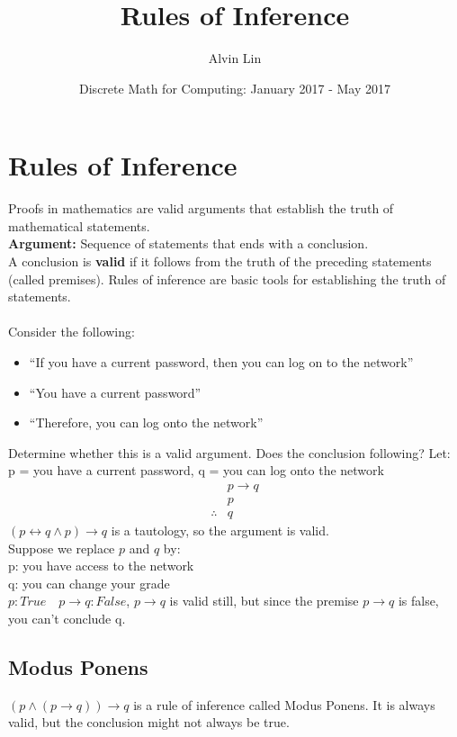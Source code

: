 \documentclass[letterpaper, 12pt]{math}
\title{Rules of Inference}
\author{Alvin Lin}
\date{Discrete Math for Computing: January 2017 - May 2017}
\begin{document}
\maketitle

\section*{Rules of Inference}
Proofs in mathematics are valid arguments that establish the truth of
mathematical statements. \\
\textbf{Argument:} Sequence of statements that ends with a conclusion. \\
A conclusion is \textbf{valid} if it follows from the truth of the preceding
statements (called premises). Rules of inference are basic tools for
establishing the truth of statements. \\ \\

Consider the following:
\begin{itemize}
  \item ``If you have a current password, then you can log on to the network''
  \item ``You have a current password''
  \item ``Therefore, you can log onto the network''
\end{itemize}
Determine whether this is a valid argument. Does the conclusion following?
Let: \\
p = you have a current password, q = you can log onto the network
\begin{align*}
  & p \to q \\
  & p \\
  \therefore & q
\end{align*}
\( (p \leftrightarrow q \wedge p) \to q \) is a tautology, so the argument is
valid. \\

Suppose we replace \( p \) and \( q \) by: \\
p: you have access to the network \\
q: you can change your grade \\
\( p: True \quad p \to q: False \), \( p \to q \) is valid still, but since
the premise \( p \to q \) is false, you can't conclude q.

\subsection*{Modus Ponens}
\( (p \wedge (p \to q)) \to q \) is a rule of inference called Modus Ponens.
It is always valid, but the conclusion might not always be true.
\end{document}
